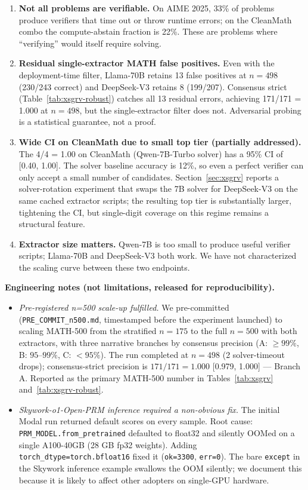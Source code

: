 \documentclass{article}
\begin{document}
\begin{enumerate}[leftmargin=*,itemsep=1pt]
\item \textbf{Not all problems are verifiable.} On AIME 2025, 33\% of problems produce verifiers that time out or throw runtime errors; on the CleanMath combo the compute-abstain fraction is 22\%. These are problems where ``verifying'' would itself require solving.
\item \textbf{Residual single-extractor MATH false positives.} Even with the deployment-time filter, Llama-70B retains 13 false positives at $n{=}498$ (230/243 correct) and DeepSeek-V3 retains 8 (199/207). Consensus strict (Table~\ref{tab:xsgrv-robust}) catches all 13 residual errors, achieving 171/171 = 1.000 at $n{=}498$, but the single-extractor filter does not. Adversarial probing is a statistical guarantee, not a proof.
\item \textbf{Wide CI on CleanMath due to small top tier (partially addressed).} The 4/4 = 1.00 on CleanMath (Qwen-7B-Turbo solver) has a 95\% CI of [0.40, 1.00]. The solver baseline accuracy is 12\%, so even a perfect verifier can only accept a small number of candidates. Section~\ref{sec:xsgrv} reports a solver-rotation experiment that swaps the 7B solver for DeepSeek-V3 on the same cached extractor scripts; the resulting top tier is substantially larger, tightening the CI, but single-digit coverage on this regime remains a structural feature.
\item \textbf{Extractor size matters.} Qwen-7B is too small to produce useful verifier scripts; Llama-70B and DeepSeek-V3 both work. We have not characterized the scaling curve between these two endpoints.
\end{enumerate}

\textbf{Engineering notes (not limitations, released for reproducibility).}
\begin{itemize}[leftmargin=*,itemsep=1pt]
\item \emph{Pre-registered n=500 scale-up fulfilled.} We pre-committed (\texttt{PRE\_COMMIT\_n500.md}, timestamped before the experiment launched) to scaling MATH-500 from the stratified $n{=}175$ to the full $n{=}500$ with both extractors, with three narrative branches by consensus precision (A: $\ge 99\%$, B: $95$--$99\%$, C: $<95\%$). The run completed at $n{=}498$ (2 solver-timeout drops); consensus-strict precision is $171/171 = 1.000$ [0.979, 1.000] --- Branch A. Reported as the primary MATH-500 number in Tables~\ref{tab:xsgrv} and~\ref{tab:xsgrv-robust}.
\item \emph{Skywork-o1-Open-PRM inference required a non-obvious fix.} The initial Modal run returned default scores on every sample. Root cause: \texttt{PRM\_MODEL.from\_pretrained} defaulted to float32 and silently OOMed on a single A100-40GB (28 GB fp32 weights). Adding \texttt{torch\_dtype=torch.bfloat16} fixed it (\texttt{ok=3300}, \texttt{err=0}). The bare \texttt{except} in the Skywork inference example swallows the OOM silently; we document this because it is likely to affect other adopters on single-GPU hardware.
\end{itemize}
\end{document}
